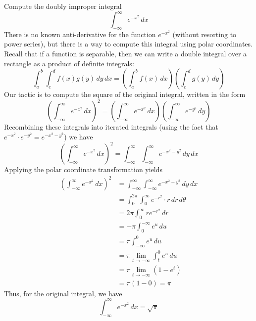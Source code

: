 \documentclass[handout]{ximera}
\begin{document}
\begin{example}[Example 4]
Compute the doubly improper integral
\[
\int_{-\infty}^{\infty} e^{-x^2} \, dx
\]
There is no known anti-derivative for the function $e^{-x^2}$ (without resorting to power series), but there is a way to compute this integral using polar coordinates.
Recall that if a function is separable, then we can write a double integral over a rectangle as a product of definite integrals:
\[
\int_a^b \int_c^d f(x)g(y) \, dy\, dx = \left(\int_a^b f(x)\, dx  \right) \left(\int_c^d g(y) \, dy \right)
\]
Our tactic is to compute the square of the original integral, written in the form
\[
\left(\int_{-\infty}^{\infty} e^{-x^2} \, dx \right)^2 = \left(\int_{-\infty}^{\infty} e^{-x^2} \, dx \right) \left(\int_{-\infty}^{\infty} e^{-y^2} \, dy \right)
\]
Recombining these integrals into iterated integrals (using the fact that $e^{-x^2} \cdot e^{-y^2}= e^{-x^2- y^2}$) we have
\[
\left(\int_{-\infty}^{\infty} e^{-x^2} \, dx \right)^2  = \int_{-\infty}^{\infty}\int_{-\infty}^{\infty} e^{-x^2 - y^2} \, dy\, dx
\]
Applying the polar coordinate transformation yields
\begin{align*}
\left(\int_{-\infty}^{\infty} e^{-x^2} \, dx \right)^2  &= \int_{-\infty}^{\infty}\int_{-\infty}^{\infty} e^{-x^2 - y^2} \, dy\, dx \\
                                                        &= \int_0^{2\pi} \int_0^\infty e^{-r^2} \cdot r \, dr \, d\theta\\
                                                        &= 2\pi \int_0^\infty r e^{-r^2}  \, dr\\
                                                        &= -\pi \int_0^{-\infty} e^u \, du\\
                                                        &= \pi \int_{-\infty}^0 e^u \, du\\
                                                        &= \pi \lim_{t \to -\infty} \int_t^0 e^u \, du\\
                                                        &= \pi \lim_{t \to -\infty} \left(1 - e^t\right)\\
                                                        &= \pi (1-0) = \pi
\end{align*}
Thus, for the original integral, we have
\[
\int_{-\infty}^{\infty} e^{-x^2} \, dx = \sqrt \pi
\]
                                                        

\end{example}
\end{document}
